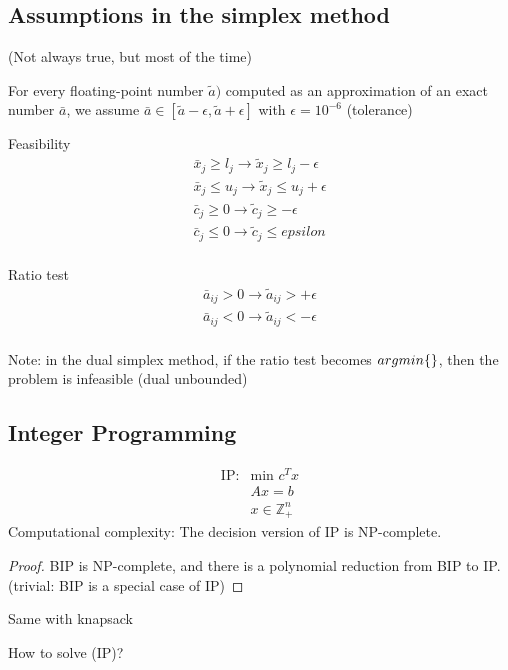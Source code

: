 \documentclass{article}
\theoremstyle{plain}
\theoremstyle{definition}
\begin{document}
\subsection{Assumptions in the simplex method}
(Not always true, but most of the time)

For every floating-point number $\tilde{a})$ computed as an approximation
of an exact number $\bar{a}$, we assume $\bar{a} \in [\tilde{a}-\epsilon,
\tilde{a}+\epsilon]$ with $\epsilon = 10^{-6}$ (tolerance)

Feasibility
\begin{align*}
    \bar{x}_j \geq l_j \rightarrow \tilde{x}_j \geq l_j - \epsilon\\
    \bar{x}_j \leq u_j \rightarrow \tilde{x}_j \leq u_j + \epsilon\\
    \bar{c}_j \geq 0 \rightarrow \tilde{c}_j \geq -\epsilon\\
    \bar{c}_j \leq 0 \rightarrow \tilde{c}_j \leq epsilon\\
\end{align*}

Ratio test
\begin{align*}
    \bar{a}_{ij} > 0 \rightarrow \tilde{a}_{ij} > +\epsilon\\
    \bar{a}_{ij} < 0 \rightarrow \tilde{a}_{ij} < -\epsilon\\
\end{align*}

Note: in the dual simplex method, if the ratio test becomes
$arg min\{\empty\}$, then the problem is infeasible
(dual unbounded)

\subsection{Integer Programming}
\begin{align*}
    \text{IP:}&\text{min } c^Tx\\
    &Ax = b\\
    &x\in\mathbb{Z}_+^{n}
\end{align*}
Computational complexity: The decision version of IP is NP-complete.

\begin{proof}
    BIP is NP-complete, and there is a polynomial reduction from BIP to
    IP. (trivial: BIP is a special case of IP)
\end{proof}

Same with knapsack

How to solve (IP)?
\end{document}
